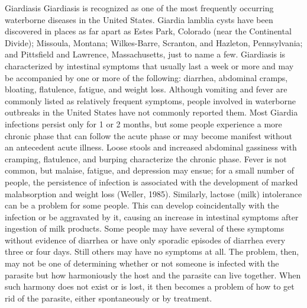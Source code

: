 \documentclass{article}
\begin{document}
Giardiasis Giardiasis is recognized as one of the most frequently
occurring waterborne diseases in the United States. Giardia lamblia
cysts have been discovered in places as far apart as Estes Park,
Colorado (near the Continental Divide); Missoula, Montana; Wilkes-Barre,
Scranton, and Hazleton, Pennsylvania; and Pittsfield and Lawrence,
Massachusetts, just to name a few. Giardiasis is characterized by
intestinal symptoms that usually last a week or more and may be
accompanied by one or more of the following: diarrhea, abdominal cramps,
bloating, flatulence, fatigue, and weight loss. Although vomiting and
fever are commonly listed as relatively frequent symptoms, people
involved in waterborne outbreaks in the United States have not commonly
reported them. Most Giardia infections persist only for 1 or 2 months,
but some people experience a more chronic phase that can follow the
acute phase or may become manifest without an antecedent acute illness.
Loose stools and increased abdominal gassiness with cramping,
flatulence, and burping characterize the chronic phase. Fever is not
common, but malaise, fatigue, and depression may ensue; for a small
number of people, the persistence of infection is associated with the
development of marked malabsorption and weight loss (Weller, 1985).
Similarly, lactose (milk) intolerance can be a problem for some people.
This can develop coincidentally with the infection or be aggravated by
it, causing an increase in intestinal symptoms after ingestion of milk
products. Some people may have several of these symptoms without
evidence of diarrhea or have only sporadic episodes of diarrhea every
three or four days. Still others may have no symptoms at all. The
problem, then, may not be one of determining whether or not someone is
infected with the parasite but how harmoniously the host and the
parasite can live together. When such harmony does not exist or is lost,
it then becomes a problem of how to get rid of the parasite, either
spontaneously or by treatment.
\end{document}
